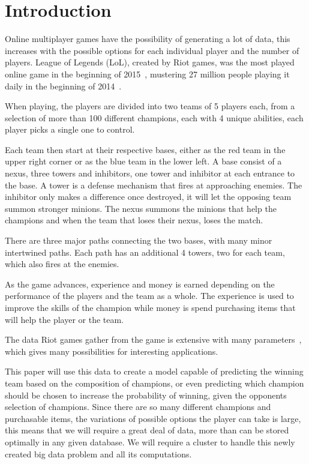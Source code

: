 \section{Introduction}\label{sec:intro}

Online multiplayer games have the possibility of generating a lot of data, this increases with the possible options for each individual player and the number of players. 
League of Legends (LoL), created by Riot games, was the most played online game in the beginning of 2015~\cite{LoLmostplayed}, mustering 27 million people playing it daily in the beginning of 2014~\cite{LoL27mill}. 

When playing, the players are divided into two teams of 5 players each, from a selection of more than 100 different champions, each with 4 unique abilities, each player picks a single one to control.

Each team then start at their respective bases, either as the red team in the upper right corner or as the blue team in the lower left. 
A base consist of a nexus, three towers and inhibitors, one tower and inhibitor at each entrance to the base. A tower is a defense mechanism that fires at approaching enemies. The inhibitor only makes a difference once destroyed, it will let the opposing team summon stronger minions. The nexus summons the minions that help the champions and when the team that loses their nexus, loses the match.

There are three major paths connecting the two bases, with many minor intertwined paths. Each path has an additional 4 towers, two for each team, which also fires at the enemies.

As the game advances, experience and money is earned depending on the performance of the players and the team as a whole. The experience is used to improve the skills of the champion while money is spend purchasing items that will help the player or the team. 

The data Riot games gather from the game is extensive with many parameters~\cite{LoLparameters}, which gives many possibilities for interesting applications. 

This paper will use this data to create a model capable of predicting the winning team based on the composition of champions, or even predicting which champion should be chosen to increase the probability of winning, given the opponents selection of champions. Since there are so many different champions and purchasable items, the variations of possible options the player can take is large, this means that we will require a great deal of data, more than can be stored optimally in any given database. We will require a cluster to handle this newly created big data problem and all its computations.


